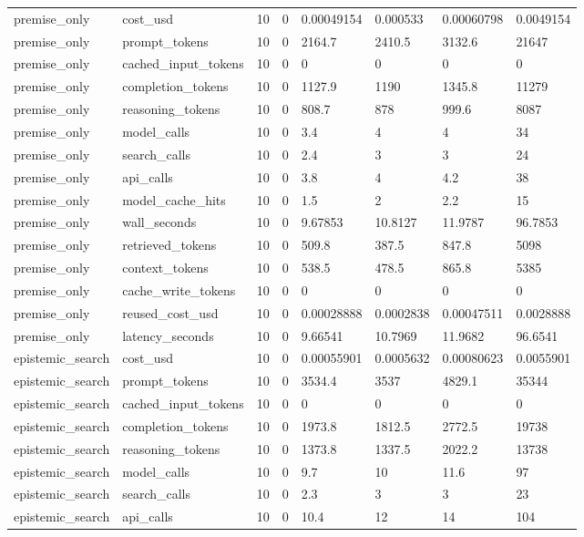 \begin{tabular}{llllllll}
premise\_only & cost\_usd & 10 & 0 & 0.00049154 & 0.000533 & 0.00060798 & 0.0049154 \\
premise\_only & prompt\_tokens & 10 & 0 & 2164.7 & 2410.5 & 3132.6 & 21647 \\
premise\_only & cached\_input\_tokens & 10 & 0 & 0 & 0 & 0 & 0 \\
premise\_only & completion\_tokens & 10 & 0 & 1127.9 & 1190 & 1345.8 & 11279 \\
premise\_only & reasoning\_tokens & 10 & 0 & 808.7 & 878 & 999.6 & 8087 \\
premise\_only & model\_calls & 10 & 0 & 3.4 & 4 & 4 & 34 \\
premise\_only & search\_calls & 10 & 0 & 2.4 & 3 & 3 & 24 \\
premise\_only & api\_calls & 10 & 0 & 3.8 & 4 & 4.2 & 38 \\
premise\_only & model\_cache\_hits & 10 & 0 & 1.5 & 2 & 2.2 & 15 \\
premise\_only & wall\_seconds & 10 & 0 & 9.67853 & 10.8127 & 11.9787 & 96.7853 \\
premise\_only & retrieved\_tokens & 10 & 0 & 509.8 & 387.5 & 847.8 & 5098 \\
premise\_only & context\_tokens & 10 & 0 & 538.5 & 478.5 & 865.8 & 5385 \\
premise\_only & cache\_write\_tokens & 10 & 0 & 0 & 0 & 0 & 0 \\
premise\_only & reused\_cost\_usd & 10 & 0 & 0.00028888 & 0.0002838 & 0.00047511 & 0.0028888 \\
premise\_only & latency\_seconds & 10 & 0 & 9.66541 & 10.7969 & 11.9682 & 96.6541 \\
epistemic\_search & cost\_usd & 10 & 0 & 0.00055901 & 0.0005632 & 0.00080623 & 0.0055901 \\
epistemic\_search & prompt\_tokens & 10 & 0 & 3534.4 & 3537 & 4829.1 & 35344 \\
epistemic\_search & cached\_input\_tokens & 10 & 0 & 0 & 0 & 0 & 0 \\
epistemic\_search & completion\_tokens & 10 & 0 & 1973.8 & 1812.5 & 2772.5 & 19738 \\
epistemic\_search & reasoning\_tokens & 10 & 0 & 1373.8 & 1337.5 & 2022.2 & 13738 \\
epistemic\_search & model\_calls & 10 & 0 & 9.7 & 10 & 11.6 & 97 \\
epistemic\_search & search\_calls & 10 & 0 & 2.3 & 3 & 3 & 23 \\
epistemic\_search & api\_calls & 10 & 0 & 10.4 & 12 & 14 & 104 \\

\end{tabular}
